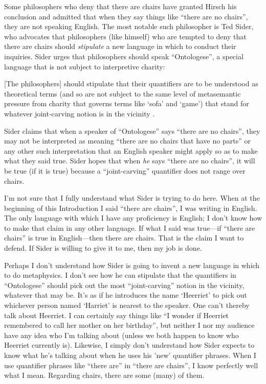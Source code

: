 \documentclass[11pt]{article}
\newenvironment{squote}{%
\begin{spacing}{1}
       	\begin{list}{}{%
\setlength{\labelwidth}{0pt}%
\rightmargin\leftmargin%
}
\item\relax
}{%
\end{list}%
\end{spacing}
}
\begin{document}
\begin{spacing}{1.25}
Some philosophers who deny that there are chairs have granted Hirsch
his conclusion and admitted that when they say things like ``there are
no chairs'', they are not speaking English.  The most notable such
philosopher is Ted Sider, who advocates that philosophers (like
himself) who are tempted to deny that there are chairs should {\em
  stipulate} a new language in which to conduct their inquiries.
Sider urges that philosophers should speak ``Ontologese'', a special
language that is not subject to interpretive charity:

\begin{squote}
{[}The philosophers{]} should stipulate that their quantifiers are to be
understood as theoretical terms (and so are not subject to the same
level of metasemantic pressure from charity that governs terms like
`sofa' and `game') that stand for whatever joint-carving notion is in
the vicinity \citeyearpar[9]{sider2011b}.
\end{squote}

Sider claims that when a speaker of ``Ontologese'' says ``there are no
chairs'', they may not be interpreted as meaning ``there are no chairs
that have no parts'' or any other such interpretation that an English
speaker might apply so as to make what they said true.  Sider hopes
that when {\em he} says ``there are no chairs'', it will be true (if
it is true) because a ``joint-carving'' quantifier does not range over
chairs.

I'm not sure that I fully understand what Sider is trying to do here.
When at the beginning of this Introduction I said ``there are
chairs'', I was writing in English.  The only language with which I
have any proficiency is English; I don't know how to make that claim
in any other language.  If what I said was true---if ``there are
chairs'' is true in English---then there are chairs.  That is the
claim I want to defend.  If Sider is willing to give it to me, then my
job is done.

Perhaps I don't understand how Sider is going to invent a new language
in which to do metaphysics.  I don't see how he can stipulate that the
quantifiers in ``Ontologese'' should pick out the most
``joint-carving'' notion in the vicinity, whatever that may be.  It's
as if he introduces the name `Heerriet' to pick out whichever person
named `Harriet' is nearest to the speaker.  One can't thereby talk
about Heerriet.  I can certainly say things like ``I wonder if
Heerriet remembered to call her mother on her birthday'', but neither
I nor my audience have any idea who I'm talking about (unless we both
happen to know who Heerriet currently is).  Likewise, I simply don't
understand how Sider expects to know what he's talking about when he
uses his 'new' quantifier phrases.  When I use quantifier phrases like
``there are'' in ``there are chairs'', I know perfectly well what I
mean.  Regarding chairs, there are some (many) of them.


\end{spacing}
\end{document}
